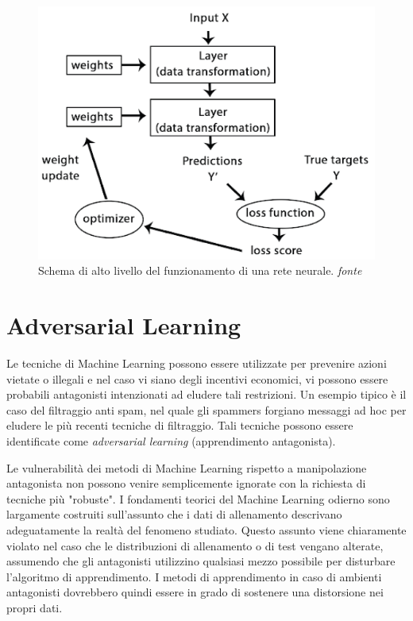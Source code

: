 \begin{figure}[!bp]
	\centering
	\includegraphics[width=0.8\columnwidth]{figures/deeploss.png}
	\caption{Schema di alto livello del funzionamento di una rete neurale. \textit{fonte}%
	~\cite{chollet2017deep} \label{fig:neuralloss} }
\end{figure}

\newpage
\section{Adversarial Learning}
\label{sec:advlearning}
Le tecniche di Machine Learning possono essere utilizzate per prevenire azioni vietate o illegali e nel caso vi siano degli incentivi economici, vi possono essere probabili antagonisti intenzionati ad eludere tali restrizioni. Un esempio tipico è il caso del filtraggio anti spam, nel quale gli spammers forgiano messaggi ad hoc per eludere le più recenti tecniche di filtraggio. Tali tecniche possono essere identificate come \textit{adversarial learning} (apprendimento antagonista).

Le vulnerabilità dei metodi di Machine Learning rispetto a manipolazione antagonista non possono venire semplicemente ignorate con la richiesta di tecniche più "robuste". I fondamenti teorici del Machine Learning odierno sono largamente costruiti sull'assunto che i dati di allenamento descrivano adeguatamente la realtà del fenomeno studiato. Questo assunto viene chiaramente violato nel caso che le distribuzioni di allenamento o di test vengano alterate, assumendo che gli antagonisti utilizzino qualsiasi mezzo possibile per disturbare l'algoritmo di apprendimento. I metodi di apprendimento in caso di ambienti antagonisti dovrebbero quindi essere in grado di sostenere una distorsione nei propri dati.

